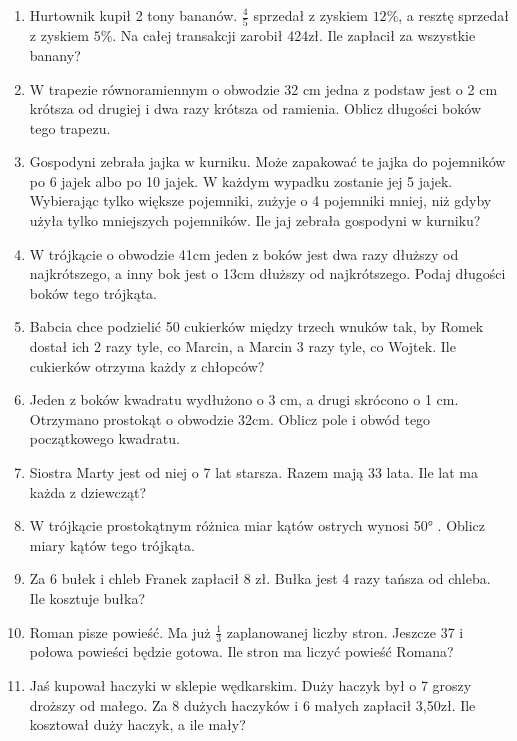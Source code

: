 \documentclass[12pt,a4paper]{article}
\begin{document}
\begin{enumerate}[1.]
	\item Hurtownik kupił 2 tony bananów. $\frac{4}{5}$ sprzedał z zyskiem $12\%$, a resztę sprzedał z zyskiem $5\%$. Na całej transakcji zarobił 424zł. Ile zapłacił za wszystkie banany?
	\item W trapezie równoramiennym o obwodzie 32 cm jedna z podstaw jest o 2 cm krótsza od drugiej i dwa razy krótsza od ramienia. Oblicz długości boków tego trapezu.
	\item Gospodyni zebrała jajka w kurniku. Może zapakować te jajka do pojemników po 6 jajek albo po 10 jajek. W każdym wypadku zostanie jej 5 jajek. Wybierając tylko większe pojemniki, zużyje o 4 pojemniki mniej, niż gdyby użyła tylko mniejszych pojemników. Ile jaj zebrała gospodyni w kurniku?
	\item W trójkącie o obwodzie 41cm jeden z boków jest dwa razy dłuższy od najkrótszego, a inny bok jest o 13cm dłuższy od najkrótszego. Podaj długości boków tego trójkąta.
	\item Babcia chce podzielić 50 cukierków między trzech wnuków tak, by Romek dostał ich 2 razy tyle, co Marcin, a Marcin 3 razy tyle, co Wojtek. Ile cukierków otrzyma każdy z chłopców?
	\item Jeden z boków kwadratu wydłużono o 3 cm, a drugi skrócono o 1 cm. Otrzymano prostokąt o obwodzie 32cm. Oblicz pole i obwód tego początkowego kwadratu.
	\item Siostra Marty jest od niej o 7 lat starsza. Razem mają 33 lata. Ile lat ma każda z dziewcząt?
	\item W trójkącie prostokątnym różnica miar kątów ostrych wynosi 50° . Oblicz miary kątów tego trójkąta.
	\item Za 6 bułek i chleb Franek zapłacił 8 zł. Bułka jest 4 razy tańsza od chleba. Ile kosztuje bułka?
	\item Roman pisze powieść. Ma już $\frac{1}{3}$ zaplanowanej liczby stron. Jeszcze 37 i połowa powieści będzie gotowa. Ile stron ma liczyć powieść Romana?
	\item Jaś kupował haczyki w sklepie wędkarskim. Duży haczyk był o 7 groszy droższy od małego. Za 8 dużych haczyków i 6 małych zapłacił 3,50zł. Ile kosztował duży haczyk, a ile mały?
\end{enumerate}
\end{document}
